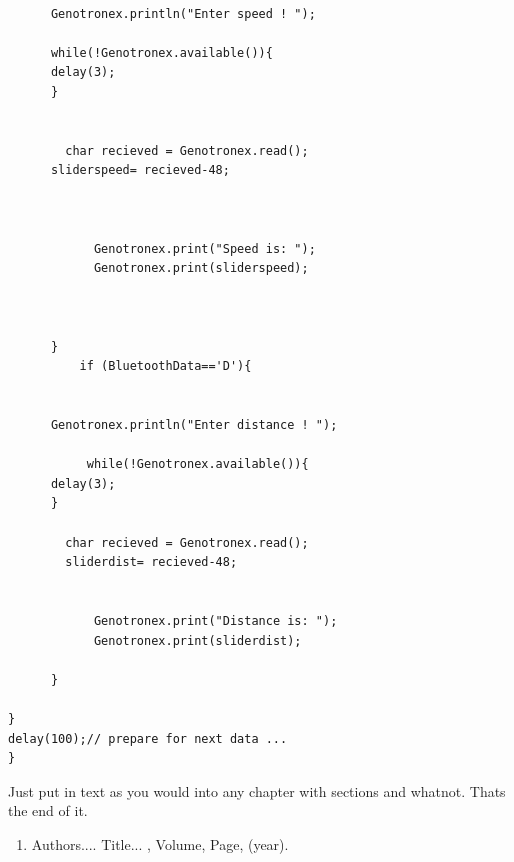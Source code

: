 \documentclass[MTech]{iitmdiss}
\begin{document}
\begin{lstlisting}
    
      Genotronex.println("Enter speed ! ");
      
      while(!Genotronex.available()){
      delay(3);
      }
 
  
        char recieved = Genotronex.read();
      sliderspeed= recieved-48; 
 
    
 
            Genotronex.print("Speed is: ");
            Genotronex.print(sliderspeed);
 
    
      
      } 
          if (BluetoothData=='D'){
  
    
      Genotronex.println("Enter distance ! ");
      
           while(!Genotronex.available()){
      delay(3);
      }
     
        char recieved = Genotronex.read();
        sliderdist= recieved-48; 

    
            Genotronex.print("Distance is: ");
            Genotronex.print(sliderdist);

      } 
      
}
delay(100);// prepare for next data ...
}
\end{lstlisting}


Just put in text as you would into any chapter with sections and
whatnot.  Thats the end of it.


\begin{singlespace}
  
\end{singlespace}



\listofpapers

\begin{enumerate}  
\item Authors....  \newblock
 Title...
  , Volume,
  Page, (year).
\end{enumerate}  
\end{document}
